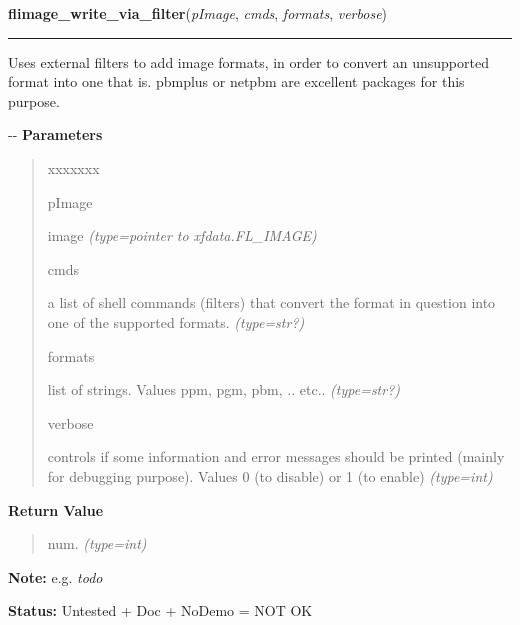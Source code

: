     \label{xformslib:flflimage:flimage_write_via_filter}

    \vspace{0.5ex}

\hspace{.8\funcindent}\begin{boxedminipage}{\funcwidth}

    \raggedright \textbf{flimage\_write\_via\_filter}(\textit{pImage}, \textit{cmds}, \textit{formats}, \textit{verbose})

    \vspace{-1.5ex}

    \rule{\textwidth}{0.5\fboxrule}
\setlength{\parskip}{2ex}

Uses external filters to add image formats, in order to convert
an unsupported format into one that is. pbmplus or netpbm are excellent
packages for this purpose.

-{}-
\setlength{\parskip}{1ex}
      \textbf{Parameters}
      \vspace{-1ex}

      \begin{quote}
        \begin{Ventry}{xxxxxxx}

          \item[pImage]


image
            {\it (type=pointer to xfdata.FL\_IMAGE)}

          \item[cmds]


a list of shell commands (filters) that convert the format in
question into one of the supported formats.
            {\it (type=str?)}

          \item[formats]


list of strings. Values ppm, pgm, pbm, .. etc..
            {\it (type=str?)}

          \item[verbose]


controls if some information and error messages should be printed
(mainly for debugging purpose). Values 0 (to disable) or 1 (to enable)
            {\it (type=int)}

        \end{Ventry}

      \end{quote}

      \textbf{Return Value}
    \vspace{-1ex}

      \begin{quote}

num.
      {\it (type=int)}

      \end{quote}

\textbf{Note:} 
e.g. \emph{todo}


\textbf{Status:} 
Untested + Doc + NoDemo = NOT OK


    \end{boxedminipage}

